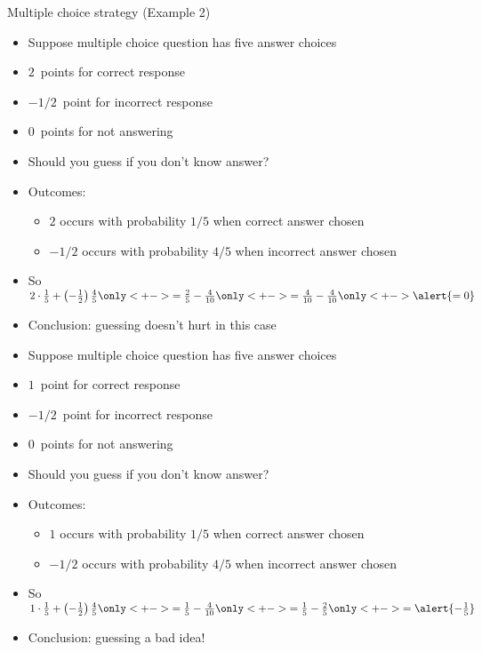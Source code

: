 \documentclass{beamer}
\theoremstyle{definition}
\begin{document}
\begin{frame}{Multiple choice strategy (Example 2)}
\begin{itemize}
\item Suppose multiple choice question has five answer choices
\item $2$~points for correct response
\item $-1/2$~point for incorrect response
\item $0$~points for not answering
\item Should you guess if you don't know answer?
\item Outcomes:
\begin{itemize}
\item $2$ occurs with probability $1/5$ when correct answer chosen
\item $-1/2$ occurs with probability $4/5$ when incorrect answer chosen
\end{itemize}
\item So $2\cdot\frac{1}{5}+\left(-\frac{1}{2}\right)\frac{4}{5}
\only<+->{=\frac{2}{5}-\frac{4}{10}}
\only<+->{=\frac{4}{10}-\frac{4}{10}}
\only<+->{\alert{=0}}$
\item Conclusion: guessing doesn't hurt \alert{in this case}
\end{itemize}
\end{frame}

\begin{frame}
\begin{itemize}
\item Suppose multiple choice question has five answer choices
\item \alert{$1$~point} for correct response
\item $-1/2$~point for incorrect response
\item $0$~points for not answering
\item Should you guess if you don't know answer?
\item Outcomes:
\begin{itemize}
\item $1$ occurs with probability $1/5$ when correct answer chosen
\item $-1/2$ occurs with probability $4/5$ when incorrect answer chosen
\end{itemize}
\item So $1\cdot\frac{1}{5}+\left(-\frac{1}{2}\right)\frac{4}{5}
\only<+->{=\frac{1}{5}-\frac{4}{10}}
\only<+->{=\frac{1}{5}-\frac{2}{5}}
\only<+->{=\alert{-\frac{1}{5}}}$
\item Conclusion: guessing a bad idea!
\end{itemize}
\end{frame}
\end{document}
